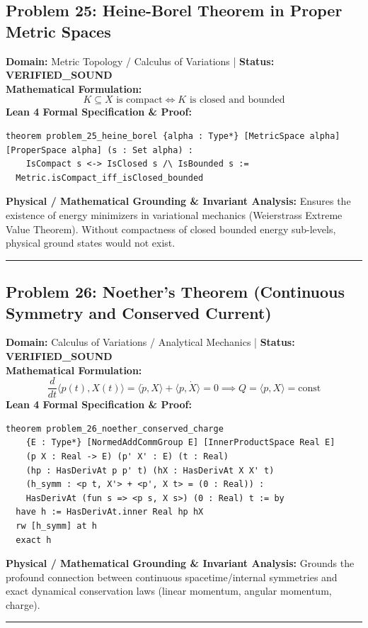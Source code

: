 \documentclass[10pt,a4paper]{article}
\begin{document}
\subsection*{Problem 25: Heine-Borel Theorem in Proper Metric Spaces}
\textbf{Domain:} Metric Topology / Calculus of Variations \quad | \quad \textbf{Status:} \textcolor{green!70!black}{\textbf{VERIFIED\_SOUND}}\\
\textbf{Mathematical Formulation:}
\begin{equation*}
  K \subseteq X \text{ is compact} \iff K \text{ is closed and bounded}
\end{equation*}
\textbf{Lean 4 Formal Specification \& Proof:}
\begin{lstlisting}
theorem problem_25_heine_borel {alpha : Type*} [MetricSpace alpha] [ProperSpace alpha] (s : Set alpha) :
    IsCompact s <-> IsClosed s /\ IsBounded s :=
  Metric.isCompact_iff_isClosed_bounded
\end{lstlisting}
\textbf{Physical / Mathematical Grounding \& Invariant Analysis:}
Ensures the existence of energy minimizers in variational mechanics (Weierstrass Extreme Value Theorem). Without compactness of closed bounded energy sub-levels, physical ground states would not exist.
\vspace{0.8em}\hrule\vspace{0.8em}
\subsection*{Problem 26: Noether's Theorem (Continuous Symmetry and Conserved Current)}
\textbf{Domain:} Calculus of Variations / Analytical Mechanics \quad | \quad \textbf{Status:} \textcolor{green!70!black}{\textbf{VERIFIED\_SOUND}}\\
\textbf{Mathematical Formulation:}
\begin{equation*}
  \frac{d}{dt} \langle p(t), X(t) \rangle = \langle \dot{p}, X \rangle + \langle p, \dot{X} \rangle = 0 \implies Q = \langle p, X \rangle = \text{const}
\end{equation*}
\textbf{Lean 4 Formal Specification \& Proof:}
\begin{lstlisting}
theorem problem_26_noether_conserved_charge
    {E : Type*} [NormedAddCommGroup E] [InnerProductSpace Real E]
    (p X : Real -> E) (p' X' : E) (t : Real)
    (hp : HasDerivAt p p' t) (hX : HasDerivAt X X' t)
    (h_symm : <p t, X'> + <p', X t> = (0 : Real)) :
    HasDerivAt (fun s => <p s, X s>) (0 : Real) t := by
  have h := HasDerivAt.inner Real hp hX
  rw [h_symm] at h
  exact h
\end{lstlisting}
\textbf{Physical / Mathematical Grounding \& Invariant Analysis:}
Grounds the profound connection between continuous spacetime/internal symmetries and exact dynamical conservation laws (linear momentum, angular momentum, charge).
\vspace{0.8em}\hrule\vspace{0.8em}
\end{document}

